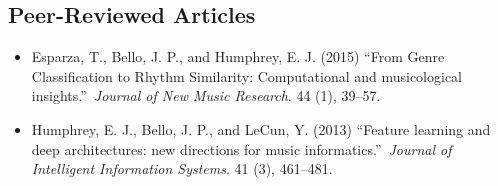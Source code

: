 \subsection{Peer-Reviewed Articles}
\renewcommand{\thefootnote}{\fnsymbol{footnote}}
\vspace{1em}
\begin{itemize}
\onehalfspacing

\item Esparza, T., Bello, J. P., and Humphrey, E. J. (2015) ``From Genre Classification to Rhythm Similarity: Computational and musicological insights.''~{\it Journal of New Music Research}. 44 (1), 39--57.

\item Humphrey, E. J., Bello, J. P., and LeCun, Y. (2013) ``Feature learning and deep architectures: new directions for music informatics.''~{\it Journal of Intelligent Information Systems}. 41 (3), 461--481.

\end{itemize}

